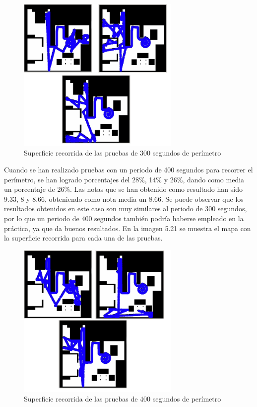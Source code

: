 \begin{figure}[H]
  \begin{center}
    \includegraphics[width=0.7\textwidth]{figures/Vacuum/Referee300.png}
		\caption{Superficie recorrida de las pruebas de 300 segundos de perímetro}
		\label{fig.Referee300}
		\end{center}
\end{figure}

Cuando se han realizado pruebas con un periodo de 400 segundos para recorrer el perímetro, se han logrado porcentajes del 28\%, 14\% y 26\%, dando como media un porcentaje de 26\%. Las notas que se han obtenido como resultado han sido 9.33, 8 y 8.66, obteniendo como nota media un 8.66. Se puede observar que los resultados obtenidos en este caso son muy similares al periodo de 300 segundos, por lo que un periodo de 400 segundos también podría haberse empleado en la práctica, ya que da buenos resultados. En la imagen 5.21 se muestra el mapa con la superficie recorrida para cada una de las pruebas.\\

\begin{figure}[H]
  \begin{center}
    \includegraphics[width=0.7\textwidth]{figures/Vacuum/Referee400.png}
		\caption{Superficie recorrida de las pruebas de 400 segundos de perímetro}
		\label{fig.Referee400}
		\end{center}
\end{figure}

